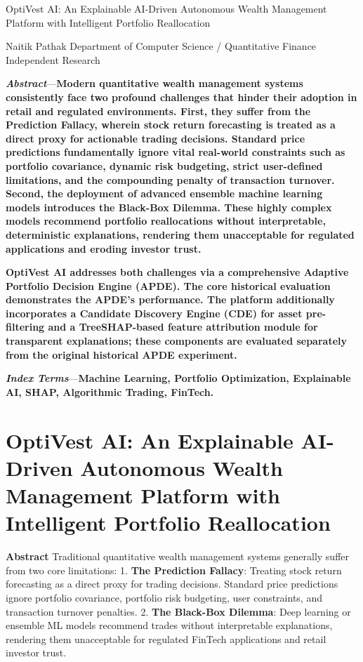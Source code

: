 \documentclass[
]{article}
\author{}
\date{}
\begin{document}
OptiVest AI: An Explainable AI-Driven Autonomous Wealth Management
Platform with Intelligent Portfolio Reallocation

Naitik Pathak Department of Computer Science / Quantitative Finance
Independent Research

\textbf{\emph{Abstract}}---\textbf{Modern quantitative wealth management
systems consistently face two profound challenges that hinder their
adoption in retail and regulated environments. First, they suffer from
the Prediction Fallacy, wherein stock return forecasting is treated as a
direct proxy for actionable trading decisions. Standard price
predictions fundamentally ignore vital real-world constraints such as
portfolio covariance, dynamic risk budgeting, strict user-defined
limitations, and the compounding penalty of transaction turnover.
Second, the deployment of advanced ensemble machine learning models
introduces the Black-Box Dilemma. These highly complex models recommend
portfolio reallocations without interpretable, deterministic
explanations, rendering them unacceptable for regulated applications and
eroding investor trust.}

\textbf{OptiVest AI addresses both challenges via a comprehensive
Adaptive Portfolio Decision Engine (APDE). The core historical
evaluation demonstrates the APDE's performance. The platform
additionally incorporates a Candidate Discovery Engine (CDE) for asset
pre-filtering and a TreeSHAP-based feature attribution module for
transparent explanations; these components are evaluated separately from
the original historical APDE experiment.}

\textbf{\emph{Index Terms}}---\textbf{Machine Learning, Portfolio
Optimization, Explainable AI, SHAP, Algorithmic Trading, FinTech.}

\section{OptiVest AI: An Explainable AI-Driven Autonomous Wealth
Management Platform with Intelligent Portfolio
Reallocation}\label{optivest-ai-an-explainable-ai-driven-autonomous-wealth-management-platform-with-intelligent-portfolio-reallocation}

\textbf{Abstract} Traditional quantitative wealth management systems
generally suffer from two core limitations: 1. \textbf{The Prediction
Fallacy}: Treating stock return forecasting as a direct proxy for
trading decisions. Standard price predictions ignore portfolio
covariance, portfolio risk budgeting, user constraints, and transaction
turnover penalties. 2. \textbf{The Black-Box Dilemma}: Deep learning or
ensemble ML models recommend trades without interpretable explanations,
rendering them unacceptable for regulated FinTech applications and
retail investor trust.
\end{document}
